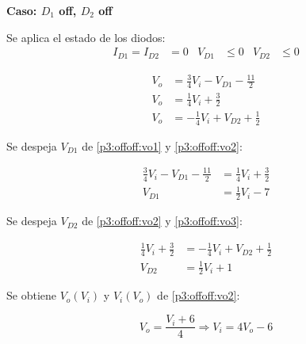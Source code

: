 %
%
%

\bigskip

\textbf{Caso: $D_1$ off, $D_2$ off}

Se aplica el estado de los diodos:
\begin{align*}
  I_{D1} = I_{D2} &= 0
  &
  V_{D1} &\leq 0
  &
  V_{D2} &\leq 0
\end{align*}

\begin{align}
  V_o &=
    \frac{3}{4} V_i
    - V_{D1}
    - \frac{11}{2} \label{p3:offoff:vo1}
  \\
  V_o &=
    \frac{1}{4} V_i
    + \frac{3}{2} \label{p3:offoff:vo2}
  \\
  V_o &=
    - \frac{1}{4} V_i
    + V_{D2}
    + \frac{1}{2} \label{p3:offoff:vo3}
\end{align}

Se despeja $V_{D1}$ de \ref{p3:offoff:vo1} y \ref{p3:offoff:vo2}:

\begin{align*}
  \frac{3}{4} V_i - V_{D1} - \frac{11}{2} &=
  \frac{1}{4} V_i          + \frac{3}{2}
  \\
  V_{D1} &= \frac{1}{2} V_i - 7
\end{align*}

Se despeja $V_{D2}$ de \ref{p3:offoff:vo2} y \ref{p3:offoff:vo3}:

\begin{align*}
  \frac{1}{4} V_i            + \frac{3}{2} &=
  - \frac{1}{4} V_i + V_{D2} + \frac{1}{2}
  \\
  V_{D2} &= \frac{1}{2} V_i + 1
\end{align*}


Se obtiene $V_o(V_i)$ y $V_i(V_o)$ de \ref{p3:offoff:vo2}:

\begin{equation*}
  V_o = \frac{V_i + 6}{4} \Rightarrow  V_i = 4 V_o - 6
\end{equation*}

